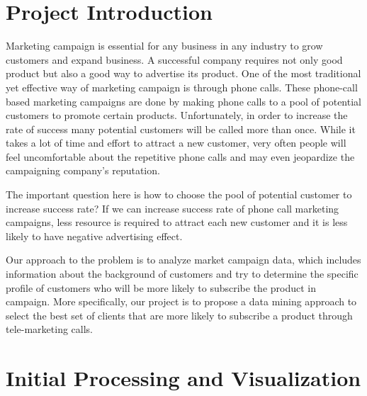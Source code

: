 \documentclass{mytemplate}%
\begin{document}
\setcounter{page}{1}
\setlength\parindent{0em}
\columnsep=20pt
\begin{multicols}{2}
\tableofcontents
\section{\color{blue} Project Introduction}
Marketing campaign is essential for any business in any industry to grow customers and expand business. A successful company requires not only good product but also a good way to advertise its product. One of the most traditional yet effective way of marketing campaign is through phone calls. These phone-call based marketing campaigns are done by making phone calls to a pool of potential customers to promote certain products. Unfortunately, in order to increase the rate of success many potential customers will be called more than once. While it takes a lot of time and effort to attract a new customer, very often people will feel uncomfortable about the repetitive phone calls and may even jeopardize the campaigning company’s reputation.

The important question here is how to choose the pool of potential customer to increase success rate? If we can increase
success rate of phone call marketing campaigns, less resource is required to attract each new customer and it is less likely
to have negative advertising effect.

Our approach to the problem is to analyze market campaign data, which includes information about the background of customers and try to determine the specific profile of customers who will be more likely to subscribe the product in campaign. More specifically, our project is to propose a data mining approach to select the best set of clients that are more likely to subscribe a product through tele-marketing calls.

\section{\color{blue}Initial Processing and Visualization}

\end{multicols}
\end{document}
